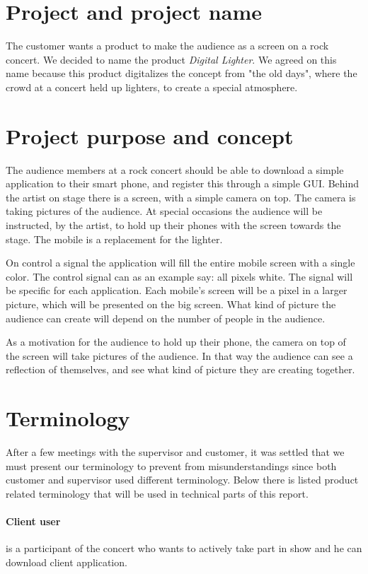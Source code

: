 \section{Project and project name}
The customer wants a product to make the audience as a screen on a rock concert. We decided to name the product \emph{Digital Lighter}. We agreed on this name because this product digitalizes the concept from "the old days", where the crowd at a concert held up lighters, to create a special atmosphere. 

\section{Project purpose and concept}
The audience members at a rock concert should be able to download a simple application to their smart phone, and register this through a simple GUI.
Behind the artist on stage there is a screen, with a simple camera on top. 
The camera is taking pictures of the audience. 
At special occasions the audience will be instructed, by the artist, to hold up their phones with the screen towards the stage. 
The mobile is a replacement for the lighter.  

On control a signal the application will fill the entire mobile screen with a single color.
The control signal can as an example say: all pixels white.
The signal will be specific for each application.
Each mobile's screen will be a pixel in a larger picture, which will be presented on the big screen. 
What kind of picture the audience can create will depend on the number of people in the audience. 

As a motivation for the audience to hold up their phone, the camera on top of the screen will take pictures of the audience.
In that way the audience can see a reflection of themselves, and see what kind of picture they are creating together.

\section {Terminology}
\label{sec:terminology}
After a few meetings with the supervisor and customer, it was settled that we must present our terminology to prevent from misunderstandings since both customer and supervisor used different terminology.
Below there is listed product related terminology that will be used in technical parts of this report.

\paragraph{Client user}
is a participant of the concert who wants to actively take part in show and he can download client application.

